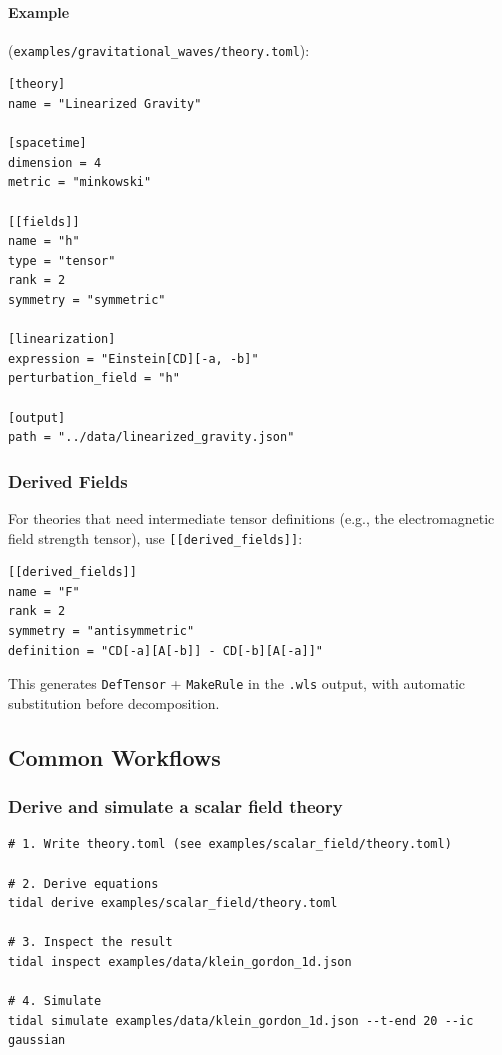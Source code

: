 \paragraph{Example} (\texttt{examples/gravitational\_waves/theory.toml}):

\begin{lstlisting}[style=toml]
[theory]
name = "Linearized Gravity"

[spacetime]
dimension = 4
metric = "minkowski"

[[fields]]
name = "h"
type = "tensor"
rank = 2
symmetry = "symmetric"

[linearization]
expression = "Einstein[CD][-a, -b]"
perturbation_field = "h"

[output]
path = "../data/linearized_gravity.json"
\end{lstlisting}

\subsubsection{Derived Fields}

For theories that need intermediate tensor definitions (e.g., the electromagnetic field strength tensor), use \texttt{[[derived\_fields]]}:

\begin{lstlisting}[style=toml]
[[derived_fields]]
name = "F"
rank = 2
symmetry = "antisymmetric"
definition = "CD[-a][A[-b]] - CD[-b][A[-a]]"
\end{lstlisting}

This generates \texttt{DefTensor} + \texttt{MakeRule} in the \texttt{.wls} output, with automatic substitution before decomposition.

\subsection{Common Workflows}

\subsubsection{Derive and simulate a scalar field theory}

\begin{lstlisting}[style=bash]
# 1. Write theory.toml (see examples/scalar_field/theory.toml)

# 2. Derive equations
tidal derive examples/scalar_field/theory.toml

# 3. Inspect the result
tidal inspect examples/data/klein_gordon_1d.json

# 4. Simulate
tidal simulate examples/data/klein_gordon_1d.json --t-end 20 --ic gaussian
\end{lstlisting}

